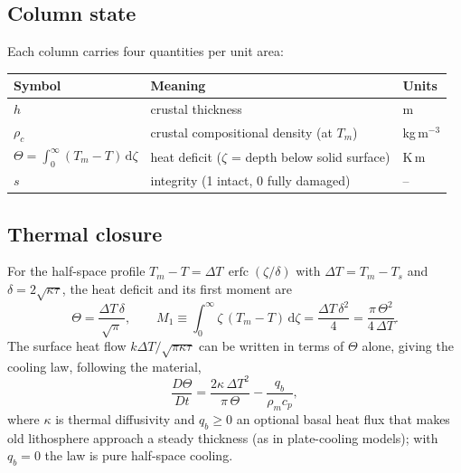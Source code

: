 \documentclass[11pt]{article}
\newcommand{\dd}{\,\mathrm{d}}
\begin{document}
\subsection{Column state}
Each column carries four quantities per unit area:
\begin{center}
\begin{tabular}{@{}lll@{}}
\toprule
Symbol & Meaning & Units\\
\midrule
$h$ & crustal thickness & m\\
$\rho_c$ & crustal compositional density (at $T_m$) & kg\,m$^{-3}$\\
$\Theta=\int_0^\infty (T_m-T)\dd\zeta$ & heat deficit ($\zeta$ = depth below solid surface) & K\,m\\
$s$ & integrity (1 intact, 0 fully damaged) & --\\
\bottomrule
\end{tabular}
\end{center}

\subsection{Thermal closure}
\label{sec:thermal}
For the half-space profile $T_m-T=\Delta T\,\operatorname{erfc}(\zeta/\delta)$ with $\Delta T=T_m-T_s$ and $\delta=2\sqrt{\kappa\tau}$, the heat deficit and its first moment are
\begin{equation}
  \Theta = \frac{\Delta T\,\delta}{\sqrt\pi},\qquad
  M_1 \equiv \int_0^\infty \zeta\,(T_m-T)\dd\zeta = \frac{\Delta T\,\delta^2}{4} = \frac{\pi\,\Theta^2}{4\,\Delta T}.
  \label{eq:moments}
\end{equation}
The surface heat flow $k\Delta T/\sqrt{\pi\kappa\tau}$ can be written in terms of $\Theta$ alone, giving the cooling law, following the material,
\begin{equation}
  \frac{D\Theta}{Dt} = \frac{2\kappa\,\Delta T^2}{\pi\,\Theta} - \frac{q_b}{\rho_m c_p},
  \label{eq:cooling}
\end{equation}
where $\kappa$ is thermal diffusivity and $q_b\ge0$ an optional basal heat flux that makes old lithosphere approach a steady thickness (as in plate-cooling models); with $q_b=0$ the law is pure half-space cooling.
\end{document}
